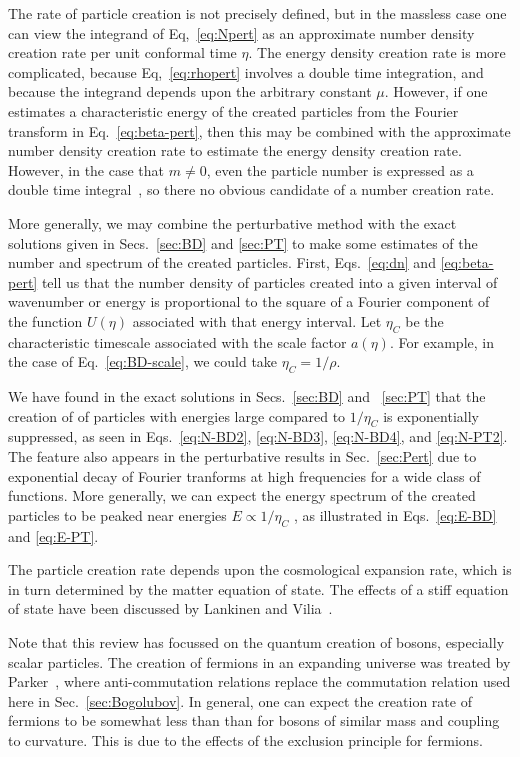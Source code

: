 \documentclass[12pt,onecolumn,eqsecnum,floats,aps,prd,floatfix,titlepage,tightenlines]{revtex4-2}
\begin{document}
The rate of particle creation is not precisely defined, but in the massless case one can  view the
integrand of Eq,~\eqref{eq:Npert} as an approximate number density creation rate per
unit conformal time $\eta$. The energy density creation rate is more complicated, because
Eq,~\eqref{eq:rhopert} involves a double time integration, and because the integrand depends
upon the arbitrary constant $\mu$. However, if one estimates a characteristic energy of the created 
particles from the Fourier transform in Eq.~\eqref{eq:beta-pert}, then this may be combined with
the  approximate number density creation rate to estimate the energy density creation rate.
However, in the case that $m \not= 0$, even the particle number is expressed as a double 
time integral~\cite{BD2}, so there no obvious candidate of a number creation rate.

More generally, we may combine the perturbative method with the exact solutions given in
Secs.~\ref{sec:BD} and \ref{sec:PT} to make some estimates of the number and spectrum
of the created particles. First, Eqs.~\eqref{eq:dn}  and \eqref{eq:beta-pert} tell us that the
number density of particles created into a given interval of wavenumber or energy is proportional
to the square of a Fourier component of the function $U(\eta)$ associated with that energy interval.
Let $\eta_C$ be the characteristic timescale associated with the scale factor $a(\eta)$. For example, in
the case of Eq.~\eqref{eq:BD-scale}, we could take $\eta_C = 1/\rho$. 

We have found in the exact solutions in Secs.~\ref{sec:BD} and ~\ref{sec:PT} that the creation of
of particles with energies large compared to $1/\eta_C$ is exponentially suppressed, as seen in 
Eqs.~\eqref{eq:N-BD2}, \eqref{eq:N-BD3}, \eqref{eq:N-BD4}, and \eqref{eq:N-PT2}. The feature
also appears in the perturbative results in Sec.~\ref{sec:Pert} due to exponential decay of Fourier
tranforms at high frequencies for a wide class of functions. More generally, we can expect the
energy spectrum of the created particles to be peaked near energies $E \propto 1/\eta_C$ , as 
illustrated in Eqs.~\eqref {eq:E-BD} and \eqref{eq:E-PT}. 

The particle creation rate depends upon the cosmological expansion rate, which is in turn determined
by the matter equation of state. The effects of a stiff equation of state have been discussed by
Lankinen and Vilia~\cite{Lankinen2017}.   

Note that this review has focussed on the quantum creation of bosons, especially scalar particles.
The creation of fermions in an expanding universe was treated by Parker~\cite{Parker71}, where
anti-commutation relations replace the commutation relation used here in Sec.~\ref{sec:Bogolubov}.
In general, one can expect the creation rate of fermions to be somewhat less than than for bosons
of similar mass and coupling to curvature. This is due to the effects of the exclusion principle for
fermions.
\end{document}
